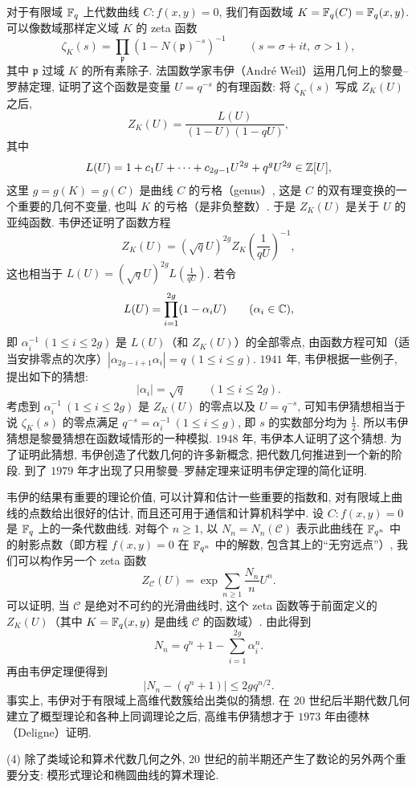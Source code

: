 对于有限域 $\mathbb{F}_q$ 上代数曲线 $C\colon f(x,y)=0$, 我们有函数域 $K=\mathbb{F}_q(C)=\mathbb{F}_q(x,y)$. 可以像数域那样定义域 $K$ 的 zeta 函数
\[
  \zeta_K(s)=\prod_{\mathfrak{p}}(1-N(\mathfrak{p})^{-s})^{-1}
  \qquad(s=\sigma+it,\ \sigma>1),
\]
其中 $\mathfrak{p}$ 过域 $K$ 的所有素除子. 法国数学家韦伊（Andr\'e Weil）运用几何上的黎曼--罗赫定理, 证明了这个函数是变量 $U=q^{-s}$ 的有理函数: 将 $\zeta_K(s)$ 写成 $Z_K(U)$ 之后,
\[
  Z_K(U)=\frac{L(U)}{(1-U)(1-qU)},
\]
其中
\[
  L(U)=1+c_1U+\cdots+c_{2g-1}U^{2g}+q^gU^{2g}\in\mathbb{Z}[U],
\]
这里 $g=g(K)=g(C)$ 是曲线 $C$ 的亏格（genus）, 这是 $C$ 的双有理变换的一个重要的几何不变量, 也叫 $K$ 的亏格（是非负整数）. 于是 $Z_K(U)$ 是关于 $U$ 的亚纯函数. 韦伊还证明了函数方程
\[
  Z_K(U)=(\sqrt{q}U)^{2g}Z_K\left(\frac{1}{qU}\right)^{-1},
\]
这也相当于 $L(U)=(\sqrt{q}U)^{2g}L\left(\frac{1}{qU}\right)$. 若令
\[
  L(U)=\prod_{i=1}^{2g}(1-\alpha_iU)\qquad(\alpha_i\in\mathbb{C}),
\]
即 $\alpha_i^{-1}\ (1\leqslant i\leqslant 2g)$ 是 $L(U)$（和 $Z_K(U)$）的全部零点, 由函数方程可知（适当安排零点的次序）$|\alpha_{2g-i+1}\alpha_i|=q\ (1\leqslant i\leqslant g)$. $1941$ 年, 韦伊根据一些例子, 提出如下的猜想:
\[
  |\alpha_i|=\sqrt{q}\qquad(1\leqslant i\leqslant 2g).
\]
考虑到 $\alpha_i^{-1}\ (1\leqslant i\leqslant 2g)$ 是 $Z_K(U)$ 的零点以及 $U=q^{-s}$, 可知韦伊猜想相当于说 $\zeta_K(s)$ 的零点满足 $q^{-s}=\alpha_i^{-1}\ (1\leqslant i\leqslant g)$, 即 $s$ 的实数部分均为 $\frac{1}{2}$. 所以韦伊猜想是黎曼猜想在函数域情形的一种模拟. $1948$ 年, 韦伊本人证明了这个猜想. 为了证明此猜想, 韦伊创造了代数几何的许多新概念, 把代数几何推进到一个新的阶段. 到了 $1979$ 年才出现了只用黎曼--罗赫定理来证明韦伊定理的简化证明.

韦伊的结果有重要的理论价值, 可以计算和估计一些重要的指数和, 对有限域上曲线的点数给出很好的估计, 而且还可用于通信和计算机科学中. 设 $C\colon f(x,y)=0$ 是 $\mathbb{F}_q$ 上的一条代数曲线. 对每个 $n\geqslant 1$, 以 $N_n=N_n(\mathcal{C})$ 表示此曲线在 $\mathbb{F}_{q^n}$ 中的射影点数（即方程 $f(x,y)=0$ 在 $\mathbb{F}_{q^n}$ 中的解数, 包含其上的``无穷远点''）, 我们可以构作另一个 zeta 函数
\[
  Z_{\mathcal{C}}(U)=\exp\sum_{n\geqslant 1}\frac{N_n}{n}U^n.
\]
可以证明, 当 $\mathcal{C}$ 是绝对不可约的光滑曲线时, 这个 zeta 函数等于前面定义的 $Z_K(U)$（其中 $K=\mathbb{F}_q(x,y)$ 是曲线 $\mathcal{C}$ 的函数域）. 由此得到
\[
  N_n=q^n+1-\sum_{i=1}^{2g}\alpha_i^n.
\]
再由韦伊定理便得到
\[
  |N_n-(q^n+1)|\leqslant 2gq^{n/2}.
\]
事实上, 韦伊对于有限域上高维代数簇给出类似的猜想. 在 $20$ 世纪后半期代数几何建立了概型理论和各种上同调理论之后, 高维韦伊猜想才于 $1973$ 年由德林（Deligne）证明.

(4) 除了类域论和算术代数几何之外, $20$ 世纪的前半期还产生了数论的另外两个重要分支: 模形式理论和椭圆曲线的算术理论.

